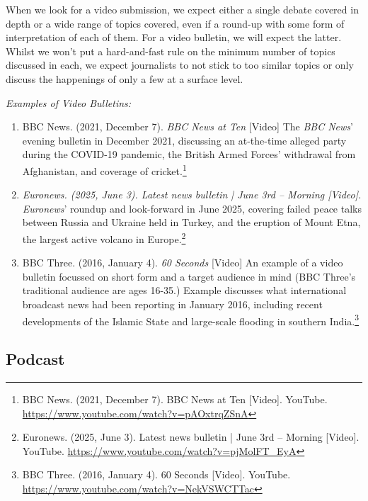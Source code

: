 When we look for a video submission, we expect either a single debate covered in depth or a wide range of topics covered, even if a round-up with some form of interpretation of each of them. For a video bulletin, we will expect the latter. Whilst we won’t put a hard-and-fast rule on the minimum number of topics discussed in each, we expect journalists to not stick to too similar topics or only discuss the happenings of only a few at a surface level.

\emph{Examples of Video Bulletins:}

\begin{enumerate}
  \item BBC News. (2021, December 7). \emph{BBC News at Ten} [Video] The \emph{BBC News}’ evening bulletin in December 2021, discussing an at-the-time alleged party during the COVID-19 pandemic, the British Armed Forces’ withdrawal from Afghanistan, and coverage of cricket.\footnote{BBC News. (2021, December 7). BBC News at Ten [Video]. YouTube. \url{https://www.youtube.com/watch?v=pAOxtrqZSnA}}
  \item \emph{Euronews. (2025, June 3). Latest news bulletin | June 3rd – Morning [Video]. Euronews}’ roundup and look-forward in June 2025, covering failed peace talks between Russia and Ukraine held in Turkey, and the eruption of Mount Etna, the largest active volcano in Europe.\footnote{Euronews. (2025, June 3). Latest news bulletin | June 3rd – Morning [Video]. YouTube. \url{https://www.youtube.com/watch?v=pjMolFT_EyA}}
  \item BBC Three. (2016, January 4). \emph{60 Seconds} [Video] An example of a video bulletin focussed on short form and a target audience in mind (BBC Three’s traditional audience are ages 16-35.) Example discusses what international broadcast news had been reporting in January 2016, including recent developments of the Islamic State and large-scale flooding in southern India.\footnote{BBC Three. (2016, January 4). 60 Seconds [Video]. YouTube. \url{https://www.youtube.com/watch?v=NekVSWCTTac}}
\end{enumerate}

\subsection{Podcast}

